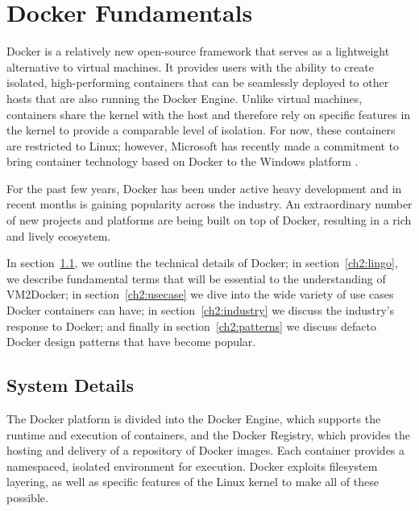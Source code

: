 \chapter{Docker Fundamentals}

Docker is a relatively new open-source framework that serves as a lightweight alternative to virtual machines. It provides users with the ability to create isolated, high-performing containers that can be seamlessly deployed to other hosts that are also running the Docker Engine. Unlike virtual machines, containers share the kernel with the host and therefore rely on specific features in the kernel to provide a comparable level of isolation. For now, these containers are restricted to Linux; however, Microsoft has recently made a commitment to bring container technology based on Docker to the Windows platform \cite{windows-docker}.

For the past few years, Docker has been under active heavy development and in recent months is gaining popularity across the industry. An extraordinary number of new projects and platforms are being built on top of Docker, resulting in a rich and lively ecosystem. 


In section~\ref{ch2:system}, we outline the technical details of Docker; in section~\ref{ch2:lingo}, we describe fundamental terms that will be essential to the understanding of VM2Docker; in section~\ref{ch2:usecase} we dive into the wide variety of use cases Docker containers can have; in section~\ref{ch2:industry} we discuss the industry's response to Docker; and finally in section~\ref{ch2:patterns} we discuss defacto Docker design patterns that have become popular.

\section{System Details}\label{ch2:system}
The Docker platform is divided into the Docker Engine, which supports the runtime and execution of containers, and the Docker Registry, which provides the hosting and delivery of a repository of Docker images. Each container provides a namespaced, isolated environment for execution. Docker exploits filesystem layering, as well as specific features of the Linux kernel to make all of these possible.

